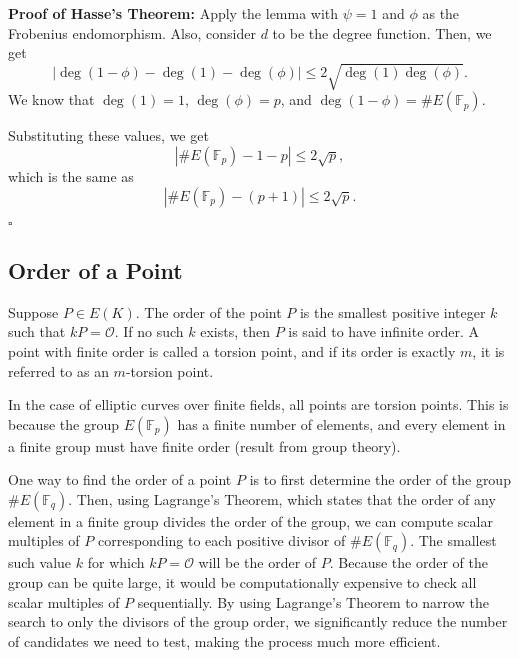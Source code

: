 \documentclass[11pt]{article}
\begin{document}
\noindent \textbf{Proof of Hasse’s Theorem:}  
Apply the lemma with \(\psi = 1\) and \(\phi\) as the Frobenius endomorphism. Also, consider \(d\) to be the degree function. Then, we get
\[|\deg(1 - \phi) - \deg(1) - \deg(\phi)| \leq 2\sqrt{\deg(1)\deg(\phi)}.\]
We know that \(\deg(1) = 1\), \(\deg(\phi) = p\), and \(\deg(1 - \phi) = \#E(\mathbb{F}_p)\).

\noindent Substituting these values, we get
\[|\#E(\mathbb{F}_p) - 1 - p| \leq 2\sqrt{p},\]
which is the same as
\[|\#E(\mathbb{F}_p) - (p + 1)| \leq 2\sqrt{p}.\]

\hfill \(\square\)




\subsection{Order of a Point}

Suppose \(P \in E(K)\). The order of the point \(P\) is the smallest positive integer \(k\) such that \(kP = \mathcal{O}\). If no such \(k\) exists, then \(P\) is said to have infinite order. A point with finite order is called a torsion point, and if its order is exactly \(m\), it is referred to as an \(m\)-torsion point.

\vspace{0.3cm}

In the case of elliptic curves over finite fields, all points are torsion points. This is because the group \(E(\mathbb{F}_p)\) has a finite number of elements, and every element in a finite group must have finite order (result from group theory).

\vspace{0.3cm}

One way to find the order of a point \(P\) is to first determine the order of the group \(\#E(\mathbb{F}_q)\).
Then, using Lagrange’s Theorem, which states that the order of any element in a finite group divides the order of the group, we can compute scalar multiples of \(P\) corresponding to each positive divisor of \(\#E(\mathbb{F}_q)\). The smallest such value \(k\) for which \(kP = \mathcal{O}\) will be the order of \(P\). Because the order of the group can be quite large, it would be computationally expensive to check all scalar multiples of \(P\) sequentially. By using Lagrange’s Theorem to narrow the search to only the divisors of the group order, we significantly reduce the number of candidates we need to test, making the process much more efficient.
\end{document}
